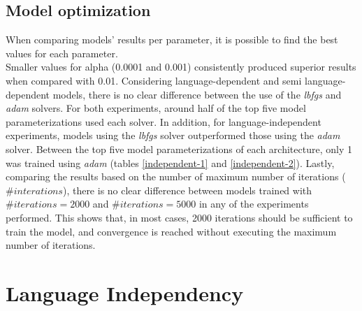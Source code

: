 \subsection{Model optimization}

When comparing models' results per parameter, it is possible to find the best values for each parameter. \\
Smaller values for alpha (0.0001 and 0.001) consistently produced superior results when compared with 0.01. Considering language-dependent and semi language-dependent models, there is no clear difference between the use of the \textit{lbfgs} and \textit{adam} solvers. For both experiments, around half of the top five model parameterizations used each solver. In addition, for language-independent experiments, models using the \textit{lbfgs} solver outperformed those using the \textit{adam} solver. Between the top five model parameterizations of each architecture, only 1 was trained using \textit{adam} (tables \ref{independent-1} and \ref{independent-2}). Lastly, comparing the results based on the number of maximum number of iterations ($\#interations$), there is no clear difference between models trained with $\#iterations = 2000$ and $\#iterations = 5000$ in any of the experiments performed. This shows that, in most cases, 2000 iterations should be sufficient to train the model, and convergence is reached without executing the maximum number of iterations.

\section{Language Independency}

